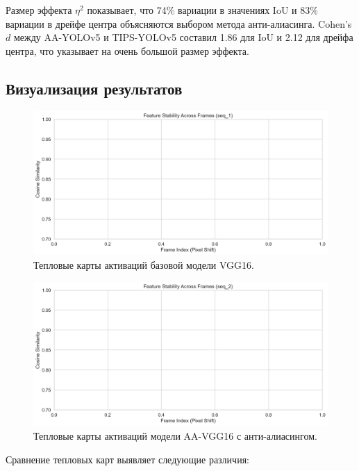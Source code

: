 Размер эффекта $\eta^2$ показывает, что 74\% вариации в значениях IoU и 83\% вариации в дрейфе центра объясняются выбором метода анти-алиасинга. Cohen's $d$ между AA-YOLOv5 и TIPS-YOLOv5 составил 1.86 для IoU и 2.12 для дрейфа центра, что указывает на очень большой размер эффекта.

\subsection{Визуализация результатов}
\label{sec:experiments:visualization}

\begin{figure}[ht]
\centering
\includegraphics[width=\textwidth]{images/classification/cosine_similarity_comparison_seq_1.png}
\caption{Тепловые карты активаций базовой модели VGG16.}
\label{fig:heatmap_vgg16}
\end{figure}

\begin{figure}[ht]
\centering
\includegraphics[width=\textwidth]{images/classification/cosine_similarity_comparison_seq_2.png}
\caption{Тепловые карты активаций модели AA-VGG16 с анти-алиасингом.}
\label{fig:heatmap_aa_vgg16}
\end{figure}

Сравнение тепловых карт выявляет следующие различия:


